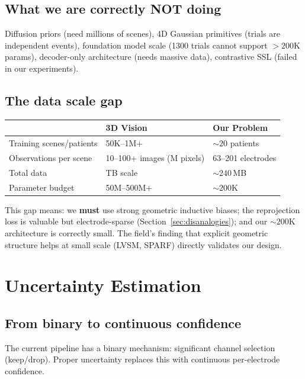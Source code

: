 \documentclass[11pt,letterpaper]{article}
\begin{document}
\subsection{What we are correctly NOT doing}

Diffusion priors (need millions of scenes), 4D Gaussian primitives (trials are independent events), foundation model scale (1300 trials cannot support ${>}200$K params), decoder-only architecture (needs massive data), contrastive SSL (failed in our experiments).

\subsection{The data scale gap}

\begin{table}[h]\centering\small
\begin{tabular}{@{}lll@{}}
\toprule
& \textbf{3D Vision} & \textbf{Our Problem} \\
\midrule
Training scenes/patients & 50K--1M+ & ${\sim}20$ patients \\
Observations per scene & 10--100+ images (M pixels) & 63--201 electrodes \\
Total data & TB scale & ${\sim}240$\,MB \\
Parameter budget & 50M--500M+ & ${\sim}200$K \\
\bottomrule
\end{tabular}
\end{table}

\noindent This gap means: we \textbf{must} use strong geometric inductive biases; the reprojection loss is valuable but electrode-sparse (Section~\ref{sec:disanalogies}); and our ${\sim}200$K architecture is correctly small. The field's finding that explicit geometric structure helps at small scale (LVSM, SPARF) directly validates our design.


\section{Uncertainty Estimation}\label{sec:uncertainty}

\subsection{From binary to continuous confidence}

The current pipeline has a binary mechanism: significant channel selection (keep/drop). Proper uncertainty replaces this with continuous per-electrode confidence.
\end{document}

